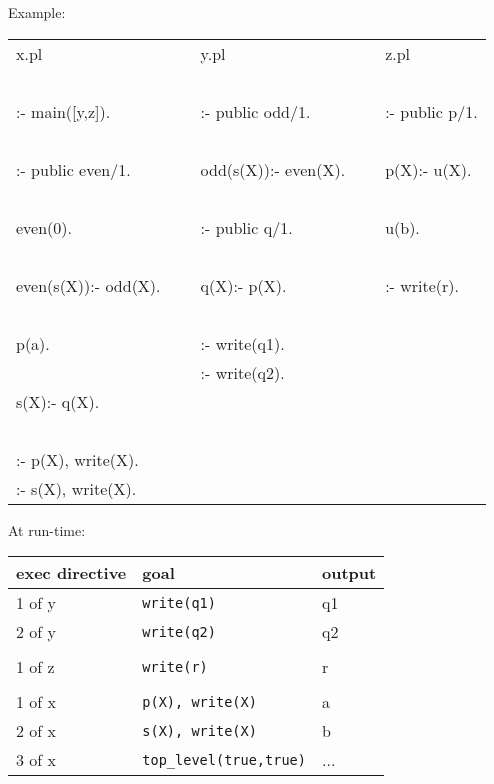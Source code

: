 Example:\\

\begin{tt}
\begin{tabular}{lllll}

x.pl                    & ~ &  y.pl                & ~ & z.pl\\
                        & ~ &                      & ~ & \\
:- main([y,z]).         & ~ & :- public odd/1.     & ~ & :- public p/1.\\
                        & ~ &                      & ~ & \\
:- public even/1.       & ~ & odd(s(X)):- even(X). & ~ & p(X):- u(X).\\
                        & ~ & 			   & ~ & \\
even(0).                & ~ & :- public q/1.       & ~ & u(b). \\
                        & ~ &                      & ~ & \\
even(s(X)):- odd(X).    & ~ & q(X):- p(X).         & ~ & :- write(r).\\
                        & ~ &                      & ~ & \\
p(a).                   & ~ & :- write(q1).        & ~ & \\
                        & ~ & :- write(q2).        & ~ & \\
s(X):- q(X).            & ~ &                      & ~ & \\
                        & ~ &                      & ~ & \\
:- p(X), write(X).      & ~ & 			   & ~ & \\
:- s(X), write(X).      & ~ & 			   & ~ & \\

\end{tabular}
\end{tt}

At run-time:~\\

\begin{center}
\begin{tabular}{|l|l|l|}
\hline
exec directive 	& goal		      & output \\
\hline
1 of y		& {\tt write(q1)}     & q1\\
2 of y		& {\tt write(q2)}     & q2\\
 		&		      &   \\
1 of z		& {\tt write(r)}      & r \\
 		&		      &   \\
1 of x		& {\tt p(X), write(X)}& a \\
2 of x		& {\tt s(X), write(X)}& b \\
3 of x		& {\tt top\_level(true,true)}  & ... \\
\hline
\end{tabular}
\end{center}


